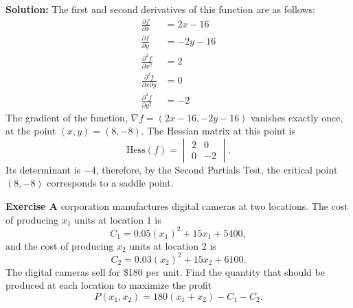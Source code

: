 \documentclass[12pt,oneside]{exam}
\newenvironment{exercise}[1]{\vspace{.1in}\noindent\textbf{Exercise #1 \hspace{.05em}}}{}
\newenvironment{newsolution}{\vspace{.1in}\noindent\textbf{Solution: \hspace{.05em}}}{}
\begin{document}
\begin{newsolution}
The first and second derivatives of this function are as follows:
\begin{align*}
\frac{\partial f}{\partial x}  & = 2x -16 \\
\frac{\partial f}{\partial y} & = -2y-16 \\
\frac{\partial^2 f}{\partial x^2} & = 2 \\
\frac{\partial^2 f}{\partial x \partial y} & = 0\\
\frac{\partial^2 f}{\partial y^2} & = -2
\end{align*}
The gradient of the function, $\nabla f = (2x-16,-2y-16)$ vanishes exactly once, at the point $(x,y)=(8,-8)$. The Hessian matrix at this point is 
\begin{equation*}
\mathrm{Hess}(f) = \begin{vmatrix}
2 & 0 \\
0 & -2
\end{vmatrix}.
\end{equation*}
Its determinant is $-4$, therefore, by the Second Partials Test, the critical point $(8,-8)$ corresponds to a saddle point. 
\end{newsolution}

\begin{exercise}{5}
A corporation manufactures digital cameras at two locations. The cost of producing $x_1$ units at location 1 is
\begin{equation*}
C_1 = 0.05(x_1)^2 + 15x_1 + 5400,
\end{equation*}
and the cost of producing $x_2$ units at location 2 is
\begin{equation*}
C_2 = 0.03(x_2)^2+15x_2+6100.
\end{equation*}
The digital cameras sell for \$180 per unit. Find the quantity that should be produced at each location to maximize the profit
\begin{equation*}
P(x_1,x_2) = 180(x_1+x_2)-C_1-C_2.
\end{equation*}
\end{exercise}
\end{document}
